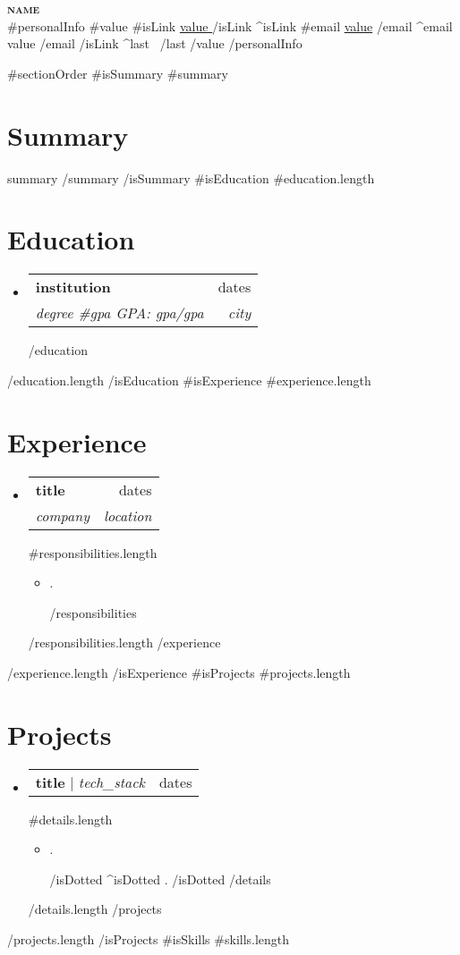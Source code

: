 \documentclass[letterpaper,11pt]{article}
\newcommand{\resumeDottedItem}[1]{
  \item\small{
    {#1 \vspace{-2pt}}
  }
}
\newcommand{\resumeParagraphItem}[1]{\small{
  {#1 \vspace{-2pt}}
}}
\newcommand{\resumeSubheading}[4]{
  \vspace{-2pt}\item
    \begin{tabularx}{\textwidth}{Xr}
      \textbf{#1} & #2 \\
      \textit{\small#3} & \textit{\small #4} \\
    \end{tabularx}\vspace{-6pt}
}
\newcommand{\resumeProjectHeading}[2]{
    \item
    \begin{tabularx}{\textwidth}{Xr}
      \small #1 & #2 \\
    \end{tabularx}\vspace{-6pt}
}
\newcommand{\resumeSubHeadingListStart}{
  \begin{itemize}[leftmargin=0.15in, label={}, itemsep=3pt, parsep=0pt, topsep=0pt]
}
\newcommand{\resumeSubHeadingListEnd}{\end{itemize}}
\newcommand{\resumeItemListStart}{
  \begin{itemize}[itemsep=2pt, parsep=0pt, topsep=0pt]
}
\newcommand{\resumeItemListEnd}{\end{itemize}\vspace{-8pt}}
\begin{document}
\begin{center}
    \textbf{\Huge \scshape {{name}}} \\ \vspace{1pt}
    \small
    {{#personalInfo}}
      {{#value}}
        {{#isLink}}
          \href{ {{{link}}} }{ \underline{ {{value}} } }
        {{/isLink}}
        {{^isLink}}
          {{#email}}
            \underline{{{value}}}
          {{/email}}
          {{^email}}
            {{value}}
          {{/email}}
        {{/isLink}}
        {{^last}} \textbar\ {{/last}}
      {{/value}}
    {{/personalInfo}}
\end{center}

{{#sectionOrder}}
  {{#isSummary}}
    {{#summary}}
      \section{Summary}
      {{summary}}
    {{/summary}}
  {{/isSummary}}
  {{#isEducation}}
    {{#education.length}}
      \section{Education}
      \resumeSubHeadingListStart
        {{#education}}
          \resumeSubheading
            { {{institution}} }{ {{dates}} }
            { {{degree}} {{#gpa}} GPA: {{gpa}}{{/gpa}} }{ {{city}} }
        {{/education}}
      \resumeSubHeadingListEnd
    {{/education.length}}
  {{/isEducation}}
  {{#isExperience}}
    {{#experience.length}}
      \section{Experience}
      \resumeSubHeadingListStart
        {{#experience}}
          \resumeSubheading
            { {{title}} }{ {{dates}} }
            { {{company}} }{ {{location}} }
            {{#responsibilities.length}}
            \resumeItemListStart
              {{#responsibilities}}
                \resumeDottedItem{ {{.}} }
              {{/responsibilities}}
            \resumeItemListEnd
            {{/responsibilities.length}}
        {{/experience}}
      \resumeSubHeadingListEnd
    {{/experience.length}}
  {{/isExperience}}
  {{#isProjects}}
    {{#projects.length}}
      \section{Projects}
      \resumeSubHeadingListStart
        {{#projects}}
          \resumeProjectHeading
            { \textbf{ {{title}} } $|$ \emph{ {{tech_stack}} } }{ {{dates}} }
            {{#details.length}}
            \resumeItemListStart
              {{#details}}
                {{#isDotted}}
                  \resumeDottedItem{ {{.}} }
                {{/isDotted}}
                {{^isDotted}}
                  \resumeParagraphItem{ {{.}} }
                {{/isDotted}}
              {{/details}}
            \resumeItemListEnd
            {{/details.length}}
        {{/projects}}
      \resumeSubHeadingListEnd
    {{/projects.length}}
  {{/isProjects}}
  {{#isSkills}}
    {{#skills.length}}
\end{document}
